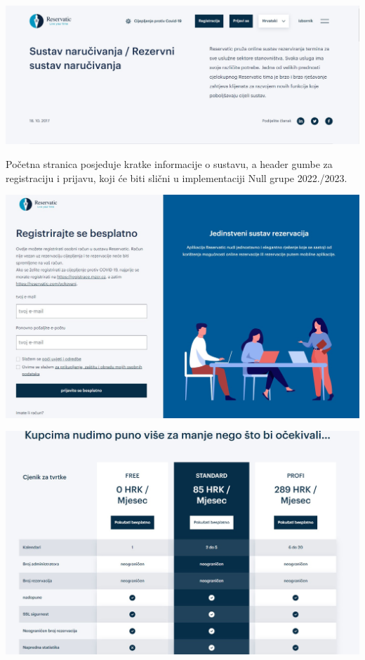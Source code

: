              \includegraphics[width=\textwidth]{slike/slicne1.jpg}
             \newline


             
             \texttt{}{Početna stranica posjeduje kratke informacije o sustavu, a header gumbe za registraciju i prijavu, koji će biti slični u implementaciji Null grupe 2022./2023.}
             \newline
            
             \includegraphics[width=\textwidth]{slike/slicne2.jpg}
             \newline

              \includegraphics[width=\textwidth]{slike/slicne3.jpg}


